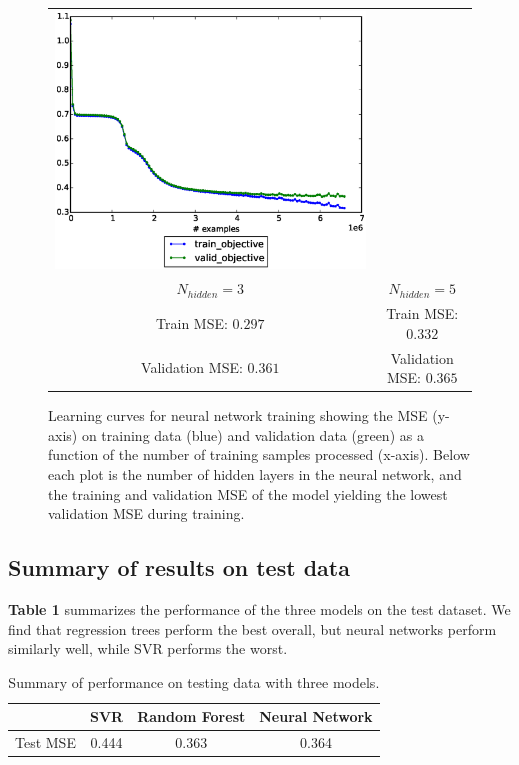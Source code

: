 \documentclass[12pt] {article}
\renewcommand{\baselinestretch}{1.2} %
\begin{document}
\begin{figure}[h!]
\begin{tabular}{cc}
\includegraphics[trim = 0mm 20mm 0mm 10mm, clip=true, width=.45\textwidth]{figdir/nn_mse_5.eps} \\
$N_{hidden}=3$ & $N_{hidden}=5$ \\
Train MSE: $0.297$ & Train MSE: $0.332$ \\
Validation MSE: $0.361$ & Validation MSE: $0.365$ \\
\end{tabular}
\caption{Learning curves for neural network training showing the MSE (y-axis) on training data (blue) and validation data (green) as a function of the number of training samples processed (x-axis). Below each plot is the number of hidden layers in the neural network, and the training and validation MSE of the model yielding the lowest validation MSE during training.}
\end{figure}
\renewcommand{\baselinestretch}{1.2} %

\subsection{Summary of results on test data}
\textbf{Table 1} summarizes the performance of the three models on the test dataset. We find that regression trees perform the best overall, but neural networks perform similarly well, while SVR performs the worst.
\begin{table}\centering
\begin{tabular}{cccc}
& SVR & Random Forest & Neural Network \\
\hline
Test MSE & 0.444 & 0.363 & 0.364
\end{tabular}
\caption{Summary of performance on testing data with three models.}
\end{table}
\end{document}
